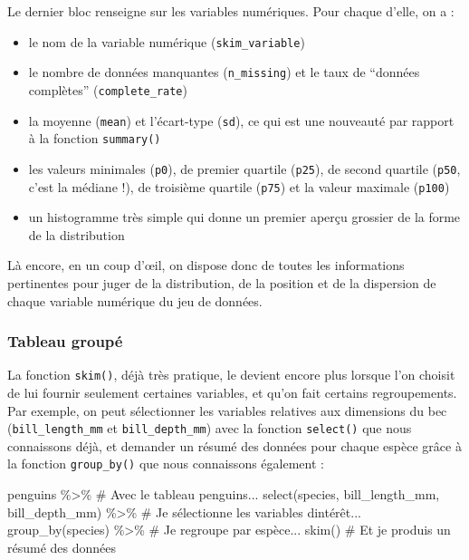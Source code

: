\documentclass[
  a4paper,
  DIV=11,
  numbers=noendperiod,
  oneside]{scrreprt}
\newenvironment{Shaded}{}{}
\newcommand{\CommentTok}[1]{\textcolor[rgb]{0.42,0.45,0.49}{#1}}
\newcommand{\FunctionTok}[1]{\textcolor[rgb]{0.44,0.26,0.76}{#1}}
\newcommand{\NormalTok}[1]{\textcolor[rgb]{0.14,0.16,0.18}{#1}}
\newcommand{\SpecialCharTok}[1]{\textcolor[rgb]{0.00,0.36,0.77}{#1}}
\providecommand{\tightlist}{%
  \setlength{\itemsep}{0pt}\setlength{\parskip}{0pt}}\usepackage{longtable,booktabs,array}
\begin{document}
Le dernier bloc renseigne sur les variables numériques. Pour chaque
d'elle, on a :

\begin{itemize}
\tightlist
\item
  le nom de la variable numérique (\texttt{skim\_variable})
\item
  le nombre de données manquantes (\texttt{n\_missing}) et le taux de
  ``données complètes'' (\texttt{complete\_rate})
\item
  la moyenne (\texttt{mean}) et l'écart-type (\texttt{sd}), ce qui est
  une nouveauté par rapport à la fonction \texttt{summary()}
\item
  les valeurs minimales (\texttt{p0}), de premier quartile
  (\texttt{p25}), de second quartile (\texttt{p50}, c'est la médiane !),
  de troisième quartile (\texttt{p75}) et la valeur maximale
  (\texttt{p100})
\item
  un histogramme très simple qui donne un premier aperçu grossier de la
  forme de la distribution
\end{itemize}

Là encore, en un coup d'œil, on dispose donc de toutes les informations
pertinentes pour juger de la distribution, de la position et de la
dispersion de chaque variable numérique du jeu de données.

\hypertarget{tableau-groupuxe9}{%
\subsubsection{Tableau groupé}\label{tableau-groupuxe9}}

La fonction \texttt{skim()}, déjà très pratique, le devient encore plus
lorsque l'on choisit de lui fournir seulement certaines variables, et
qu'on fait certains regroupements. Par exemple, on peut sélectionner les
variables relatives aux dimensions du bec (\texttt{bill\_length\_mm} et
\texttt{bill\_depth\_mm}) avec la fonction \texttt{select()} que nous
connaissons déjà, et demander un résumé des données pour chaque espèce
grâce à la fonction \texttt{group\_by()} que nous connaissons également
:

\begin{Shaded}
\begin{Highlighting}[]
\NormalTok{penguins }\SpecialCharTok{\%\textgreater{}\%}                     \CommentTok{\# Avec le tableau penguins...}
  \FunctionTok{select}\NormalTok{(species, }
\NormalTok{         bill\_length\_mm,}
\NormalTok{         bill\_depth\_mm) }\SpecialCharTok{\%\textgreater{}\%}      \CommentTok{\# Je sélectionne les variables d\textquotesingle{}intérêt...}
  \FunctionTok{group\_by}\NormalTok{(species) }\SpecialCharTok{\%\textgreater{}\%}          \CommentTok{\# Je regroupe par espèce...}
  \FunctionTok{skim}\NormalTok{()                         }\CommentTok{\# Et je produis un résumé des données}
\end{Highlighting}
\end{Shaded}
\end{document}
